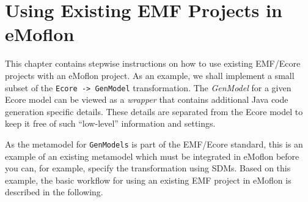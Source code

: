 \newpage

\section{Using Existing EMF Projects in eMoflon}
\visHeader

This chapter contains stepwise instructions on how to use existing \mbox{EMF}/\-Ecore projects with an eMoflon project.  As an example, we shall implement a
small subset of the \texttt{Ecore -> GenModel} transformation. The \emph{GenModel} for a given Ecore model can be viewed as a \emph{wrapper} that contains
additional Java code generation specific details. These details are separated from the Ecore model to keep it free of such ``low-level'' information and
settings.

As the metamodel for \texttt{GenModels} is part of the EMF/Ecore standard, this is an example of an existing metamodel which must be integrated in eMoflon
before you can, for example, specify the transformation using SDMs.
Based on this example, the basic workflow for using an existing EMF project in eMoflon is described in the following.




